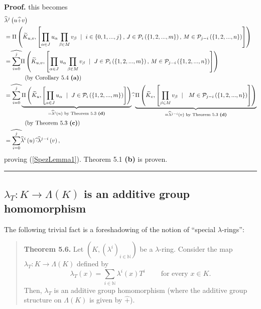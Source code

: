 \documentclass[numbers=enddot,12pt,final,onecolumn,notitlepage]{scrartcl}%
\newenvironment{proof}[1][Proof]{\noindent\textbf{#1.} }{\ \rule{0.5em}{0.5em}}
\begin{document}
\begin{proof}
this becomes%
\begin{align*}
&  \widehat{\lambda}^{j}\left(  u\widehat{+}v\right) \\
&  =\Pi\left(  \widetilde{K}_{u,v},\left[  \prod\limits_{\alpha\in J}%
u_{\alpha}\prod\limits_{\beta\in M}v_{\beta}\ \mid\ i\in\left\{
0,1,...,j\right\}  \text{, }J\in\mathcal{P}_{i}\left(  \left\{
1,2,...,m\right\}  \right)  \text{, }M\in\mathcal{P}_{j-i}\left(  \left\{
1,2,...,n\right\}  \right)  \right]  \right) \\
&  =\widehat{\sum_{i=0}^{j}}\Pi\left(  \widetilde{K}_{u,v},\left[
\prod\limits_{\alpha\in J}u_{\alpha}\prod\limits_{\beta\in M}v_{\beta}%
\ \mid\ J\in\mathcal{P}_{i}\left(  \left\{  1,2,...,m\right\}  \right)
\text{, }M\in\mathcal{P}_{j-i}\left(  \left\{  1,2,...,n\right\}  \right)
\right]  \right) \\
&  \ \ \ \ \ \ \ \ \ \ \left(  \text{by Corollary 5.4 \textbf{(a)}}\right) \\
&  =\widehat{\sum_{i=0}^{j}}\underbrace{\Pi\left(  \widetilde{K}_{u},\left[
\prod\limits_{\alpha\in J}u_{\alpha}\ \mid\ J\in\mathcal{P}_{i}\left(
\left\{  1,2,...,m\right\}  \right)  \right]  \right)  }_{=\widehat{\lambda
}^{i}\left(  u\right)  \text{ by Theorem 5.3 \textbf{(d)}}}\widehat{\cdot
}\underbrace{\Pi\left(  \widetilde{K}_{v},\left[  \prod\limits_{\beta\in
M}v_{\beta}\ \mid\ \text{ }M\in\mathcal{P}_{j-i}\left(  \left\{
1,2,...,n\right\}  \right)  \right]  \right)  }_{=\widehat{\lambda}%
^{j-i}\left(  v\right)  \text{ by Theorem 5.3 \textbf{(d)}}}\\
&  \ \ \ \ \ \ \ \ \ \ \left(  \text{by Theorem 5.3 \textbf{(c)}}\right) \\
&  =\widehat{\sum_{i=0}^{j}}\widehat{\lambda}^{i}\left(  u\right)
\widehat{\cdot}\widehat{\lambda}^{j-i}\left(  v\right)  ,
\end{align*}
proving (\ref{SpezLemma1}). Theorem 5.1 \textbf{(b)} is proven.
\end{proof}

\subsection{$\lambda_{T}:K\rightarrow\Lambda\left(  K\right)  $ is an additive
group homomorphism}

The following trivial fact is a foreshadowing of the notion of ``special
$\lambda$-rings'':

\begin{quote}
\textbf{Theorem 5.6.} Let $\left(  K,\left(  \lambda^{i}\right)
_{i\in\mathbb{N}}\right)  $ be a $\lambda$-ring. Consider the map $\lambda
_{T}:K\rightarrow\Lambda\left(  K\right)  $ defined by
\[
\lambda_{T}\left(  x\right)  =\sum\limits_{i\in\mathbb{N}}\lambda^{i}\left(
x\right)  T^{i}\ \ \ \ \ \ \ \ \ \ \text{for every }x\in K.
\]
Then, $\lambda_{T}$ is an additive group homomorphism (where the additive
group structure on $\Lambda\left(  K\right)  $ is given by $\widehat{+}$).
\end{quote}
\end{document}
